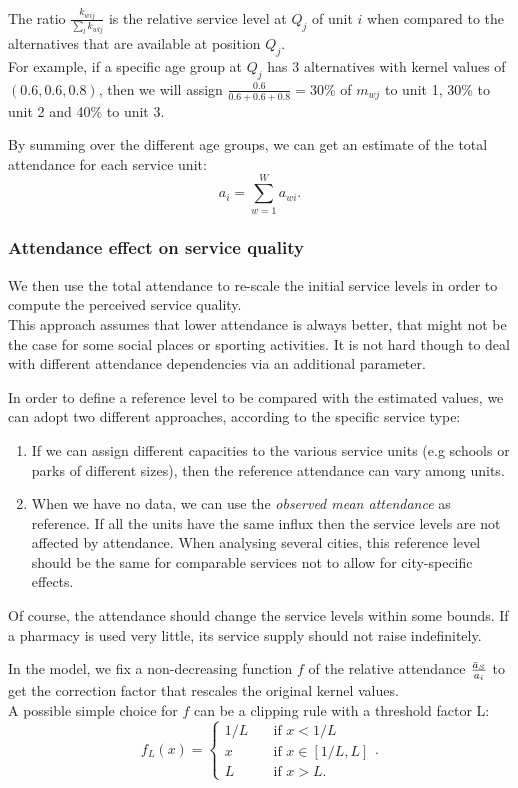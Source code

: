 \documentclass{article}
\begin{document}
The ratio $\frac{k_{wij}}{\sum_l{k_{wlj}}}$ is the relative service level at $Q_j$ of unit $i$ when compared to the alternatives that are available at position $Q_j$. \\
For example, if a specific age group at $Q_j$ has 3 alternatives with kernel values of $(0.6, 0.6, 0.8)$, then we will assign $\frac{0.6}{0.6+0.6+0.8}=30\%$ of $m_{wj}$ to unit 1, 30\% to unit 2 and 40\% to unit 3.

By summing over the different age groups, we can get an estimate of the total attendance for each service unit:
    \[ a_i = \sum_{w=1}^W a_{wi}. \]
    
\subsubsection{Attendance effect on service quality}
We then use the total attendance to re-scale the initial service levels in order to compute the perceived service quality. \\
This approach assumes that lower attendance is always better, that might not be the case for some social places or sporting activities. It is not hard though to deal with different attendance dependencies via an additional parameter.

In order to define a reference level to be compared with the estimated values, we can adopt two different approaches, according to the specific service type:
\begin{enumerate}
    \item If we can assign different capacities to the various service units (e.g schools or parks of different sizes), then the reference attendance can vary among units.
    \item When we have no data, we can use the \textit{observed mean attendance} as reference. If all the units have the same influx then the service levels are not affected by attendance. When analysing several cities, this reference level should be the same for comparable services not to allow for city-specific effects.
\end{enumerate}

Of course, the attendance should change the service levels within some bounds. If a pharmacy is used very little, its service supply should not raise indefinitely.

In the model, we fix a non-decreasing function $f$ of the relative attendance $\frac{\Bar{a}_S}{a_i}$ to get the correction factor that rescales the original kernel values. \\
A possible simple choice for $f$ can be a clipping rule with a threshold factor L:
\[
f_L(x) = \left\{\begin{array}{ll}
    1/L \quad &\text{if } x < 1/L \\
    x \quad &\text{if }  x \in [1/L, L] \\
    L \quad &\text{if }  x > L.
    \end{array} \right..
 \] 
    
\end{document}

